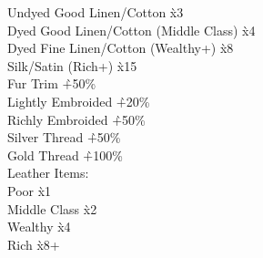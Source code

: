 \begin{multicols}{3}
{\begin{tabbing}
Undyed Good Linen/Cotton					\` x3 \\
Dyed Good Linen/Cotton (Middle Class)				\` x4 \\
Dyed Fine Linen/Cotton (Wealthy+)				\` x8 \\
Silk/Satin (Rich+)					 	\` x15 \\
Fur Trim							\` +50\% \\
Lightly Embroided						\` +20\% \\
Richly Embroided			 			\` +50\% \\
Silver Thread							\` +50\% \\
Gold Thread							\` +100\% \\
Leather Items: \\
\hspace{0.4cm} Poor						\` x1 \\
\hspace{0.4cm} Middle Class					\` x2 \\
\hspace{0.4cm} Wealthy						\` x4 \\
\hspace{0.4cm} Rich						\` x8+ \\
\end{tabbing}

}
\end{multicols}
